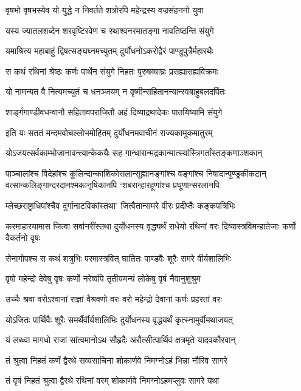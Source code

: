 \twolineshloka
{वृषभो वृषभस्येव यो युद्धे न निवर्तते}
{शत्रोरपि महेन्द्रस्य वज्रसंहननो युवा}


\twolineshloka
{यस्य ज्यातलशब्देन शरवृष्टिरवेण च}
{रथाश्वनरमातङ्गा नावतिष्ठन्ति संयुगे}


\twolineshloka
{यमाश्रित्य महाबाहुं द्विषत्सङ्घघ्नमच्युतम्}
{दुर्योधनोऽकरोद्वैरं पाण्डुपुत्रैर्महारथैः}


\twolineshloka
{स कथं रथिनां श्रेष्ठः कर्णः पार्थेन संयुगे}
{निहतः पुरुषव्याघ्रः प्रसह्यासह्यविक्रमः}


\twolineshloka
{यो नामन्यत वै नित्यमच्युतं च धनञ्जयम्}
{न वृष्मीन्सहितानन्यान्स्वबाहुबलदर्पितः}


\twolineshloka
{शार्ङ्गगाण्डीवधन्वानौ सहितावपराजितौ}
{अहं दिव्याद्रथादेकः पातयिष्यामि संयुगे}


\twolineshloka
{इति यः सततं मन्दमवोचल्लोभमोहितम्}
{दुर्योधनमवाचीनं राज्यकामुकमातुरम्}


\threelineshloka
{योऽजयत्सर्वकाम्भोजानावन्त्यान्केकयैः सह}
{गान्धारान्मद्रकान्मात्स्यांस्त्रिगर्तांस्तङ्कणाञ्शकान्}
{}


पाञ्चालांश्च विदेहांश्च कुलिन्दान्काशिकोसलान्सूह्मानङ्गांश्च वङ्गांश्च निषादान्पुण्ड्रकीकटान्
\twolineshloka
{वत्सान्कलिङ्गान्दरदानश्मकानृषिकानपि}
{`शबरान्हारहूणांश्च प्रघूणान्सरलानपि}


\twolineshloka
{म्लेच्छराष्ट्राधिपांश्चैव दुर्गानाटविकांस्तथा'}
{जित्वैतान्समरे वीरः प्रदीप्तैः कङ्कपत्रिभिः}


\threelineshloka
{करमाहारयामास जित्वा सर्वानरींस्तथा}
{दुर्योधनस्य वृद्ध्यर्थं राधेयो रथिनां वरः}
{दिव्यास्त्रविमन्हातेजाः कर्णो वैकर्तनो वृषः}


\twolineshloka
{सेनागोपश्च स कथं शत्रुभिः परमास्त्रवित्}
{घातितः पाण्डवैः शूरैः समरे वीर्यशालिभिः}


\twolineshloka
{वृषो महेन्द्रो देवेषु वृषः कर्णो नरेष्वपि}
{तृतीयमन्यं लोकेषु वृषं नैवानुशुश्रुम}


\twolineshloka
{उच्चैः श्रवा वरोऽश्वानां राज्ञां वैश्रवणो वरः}
{वरो महेन्द्रो देवानां कर्णः प्रहरतां वरः}


\twolineshloka
{योऽजितः पार्थिवैः शूरैः समर्थैर्वीर्यशालिभिः}
{दुर्योधनस्य वृद्ध्यर्थं कृत्स्नामुर्वीमथाजयत्}


\twolineshloka
{यं लब्ध्वा मागधो राजा सांत्वमानोऽथ सौहृदैः}
{अरौत्सीत्पार्थिवं क्षत्रमृते यादवकौरवान्}


\twolineshloka
{तं श्रुत्वा निहतं कर्णं द्वैरथे सव्यसाचिना}
{शोकार्णवे निमग्नोऽहं भिन्ना नौरिव सागरे}


\twolineshloka
{तं वृषं निहतं श्रुत्वा द्वैरथे रथिनां वरम्}
{शोकार्णवे निमग्नोऽहमप्लुवः सागरे यथा}


